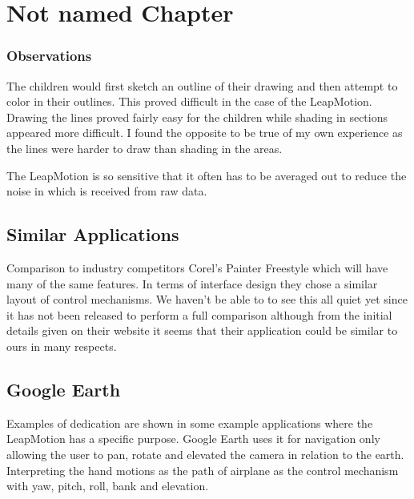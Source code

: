 
\chapter{Not named Chapter} %

\label{Chapter5} %



\subsection{Observations}
The children would first sketch an outline of their drawing and then attempt to color in their outlines. This proved difficult in the case of the LeapMotion. Drawing the lines proved fairly easy for the children while shading in sections appeared more difficult. I found the opposite to be true of my own experience as the lines were harder to draw than shading in the areas.

The LeapMotion is so sensitive that it often has to be averaged out to reduce the noise in which is received from raw data. 

\section{Similar Applications}

Comparison to industry competitors Corel's Painter Freestyle which will have many of the same features. In terms of interface design they chose a similar layout of control mechanisms. We haven't be able to to see this all quiet yet since it has not been released to perform a full comparison although from the initial details given on their website it seems that their application could be similar to ours in many respects. \cite{corel}

\section{Google Earth}
Examples of dedication are shown in some example applications where the LeapMotion has a specific purpose. Google Earth uses it for navigation only allowing the user to pan, rotate and elevated the camera in relation to the earth. Interpreting the hand motions as the path of airplane as the control mechanism with yaw, pitch, roll, bank and elevation. 

